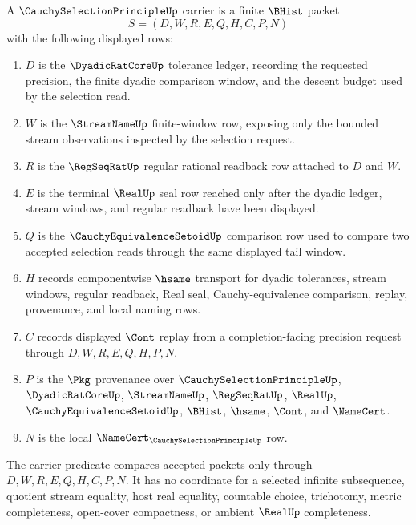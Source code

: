 \begin{definition}
\label{def:cauchy-selection-principle-carrier}
A $\CauchySelectionPrincipleUp$ carrier is a finite $\BHist$ packet
$$
S=(D,W,R,E,Q,H,C,P,N)
$$
with the following displayed rows:
\begin{enumerate}
\item $D$ is the $\DyadicRatCoreUp$ tolerance ledger, recording the requested precision, the finite dyadic comparison window, and the descent budget used by the selection read.
\item $W$ is the $\StreamNameUp$ finite-window row, exposing only the bounded stream observations inspected by the selection request.
\item $R$ is the $\RegSeqRatUp$ regular rational readback row attached to $D$ and $W$.
\item $E$ is the terminal $\RealUp$ seal row reached only after the dyadic ledger, stream windows, and regular readback have been displayed.
\item $Q$ is the $\CauchyEquivalenceSetoidUp$ comparison row used to compare two accepted selection reads through the same displayed tail window.
\item $H$ records componentwise $\hsame$ transport for dyadic tolerances, stream windows, regular readback, Real seal, Cauchy-equivalence comparison, replay, provenance, and local naming rows.
\item $C$ records displayed $\Cont$ replay from a completion-facing precision request through $D,W,R,E,Q,H,P,N$.
\item $P$ is the $\Pkg$ provenance over $\CauchySelectionPrincipleUp$, $\DyadicRatCoreUp$, $\StreamNameUp$, $\RegSeqRatUp$, $\RealUp$, $\CauchyEquivalenceSetoidUp$, $\BHist$, $\hsame$, $\Cont$, and $\NameCert$.
\item $N$ is the local $\NameCert_{\CauchySelectionPrincipleUp}$ row.
\end{enumerate}
The carrier predicate compares accepted packets only through $D,W,R,E,Q,H,C,P,N$. It has no coordinate for a selected infinite subsequence, quotient stream equality, host real equality, countable choice, trichotomy, metric completeness, open-cover compactness, or ambient $\RealUp$ completeness.
\end{definition}

